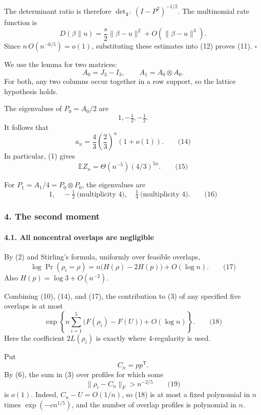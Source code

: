 \documentclass[
  11pt,
  a4paper,
]{article}
\begin{document}
The determinant ratio is therefore
\(\det_{\mathbf1^\perp}(I-P^2)^{-1/2}\). The multinomial rate function
is \[
D(\beta\|u)=\frac s2\|\beta-u\|^2+O(\|\beta-u\|^3).
\] Since \(n\,O(n^{-6/5})=o(1)\), substituting these estimates into (12)
proves (11). \(\square\)

We use the lemma for two matrices: \[
A_0=J_3-I_3,
\qquad
A_1=A_0\otimes A_0.
\] For both, any two columns occur together in a row support, so the
lattice hypothesis holds.

The eigenvalues of \(P_0=A_0/2\) are \[
1,-\tfrac12,-\tfrac12.
\] It follows that \[
a_n=\frac43\left(\frac23\right)^n(1+o(1)).                       \qquad\text{(14)}
\] In particular, (1) gives \[
\mathbb E Z_n=\Theta(n^{-5})(4/3)^{5n}.                          \qquad\text{(15)}
\]

For \(P_1=A_1/4=P_0\otimes P_0\), the eigenvalues are \[
1,\quad -\tfrac12\ \text{(multiplicity 4)},\quad
\tfrac14\ \text{(multiplicity 4)}.                              \qquad\text{(16)}
\]

\subsubsection{4. The second moment}\label{the-second-moment}

\paragraph{4.1. All noncentral overlaps are
negligible}\label{all-noncentral-overlaps-are-negligible}

By (2) and Stirling's formula, uniformly over feasible overlaps, \[
\log\Pr(\rho_i=\rho)
 =n\bigl(H(\rho)-2H(p)\bigr)+O(\log n).                          \qquad\text{(17)}
\] Also \(H(p)=\log3+O(n^{-2})\).

Combining (10), (14), and (17), the contribution to (3) of any specified
five overlaps is at most \[
\exp\left\{
 n\sum_{i=1}^5\bigl(F(\rho_i)-F(U)\bigr)+O(\log n)
\right\}.                                                       \qquad\text{(18)}
\] Here the coefficient \(2L(\rho_i)\) is exactly where 4-regularity is
used.

Put \[
C_n=pp^{\mathsf T}.
\] By (6), the sum in (3) over profiles for which some \[
\|\rho_i-C_n\|_F>n^{-2/5}                                       \qquad\text{(19)}
\] is \(o(1)\). Indeed, \(C_n-U=O(1/n)\), so (18) is at most a fixed
polynomial in \(n\) times \(\exp(-c n^{1/5})\), and the number of
overlap profiles is polynomial in \(n\).
\end{document}

